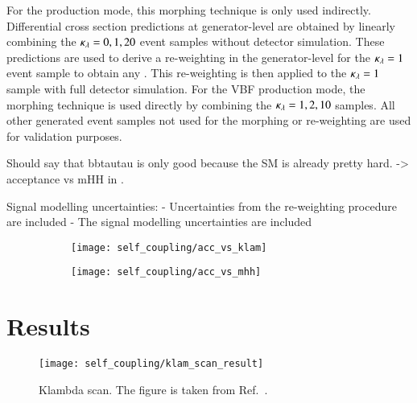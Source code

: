 For the \ggF production mode, this morphing technique is only used
indirectly. Differential cross section predictions at generator-level
are obtained by linearly combining the $\kappa_{\lambda} = 0, 1, 20$ event
samples without detector simulation. These predictions are used to
derive a re-weighting in the generator-level \mHH for the
$\kappa_{\lambda} = 1$ event sample to obtain any \klambda. This re-weighting
is then applied to the $\kappa_{\lambda} = 1$ sample with full detector
simulation. For the VBF production mode, the morphing technique is
used directly by combining the $\kappa_{\lambda} = 1, 2, 10$ samples. All
other generated event samples not used for the morphing or
re-weighting are used for validation purposes.






Should say that bbtautau is only good because the SM is already pretty
hard. -> acceptance vs mHH in \hadhad.


Signal modelling uncertainties:
- Uncertainties from the re-weighting procedure are included
- The signal modelling uncertainties are included

\begin{figure}[htbp]
  \centering

  \begin{subfigure}[t]{0.485\textwidth}
    \texttt{[image: self\_coupling/acc\_vs\_klam]}
    \subcaption{}
  \end{subfigure}\hfill%
  \begin{subfigure}[t]{0.485\textwidth}
    \texttt{[image: self\_coupling/acc\_vs\_mhh]}
    \subcaption{}
  \end{subfigure}

  \caption{}%
  \label{fig:acceptance_vs_klambda}
\end{figure}


\section{Results}%
\label{sec:reinterpretation_results}


\begin{figure}[htbp]
  \centering

  \texttt{[image: self\_coupling/klam\_scan\_result]}

  \caption{Klambda scan. The figure is taken from
    Ref.~\cite{ATLAS-CONF-2021-052}.}%
  \label{fig:klambda_scan}
\end{figure}

